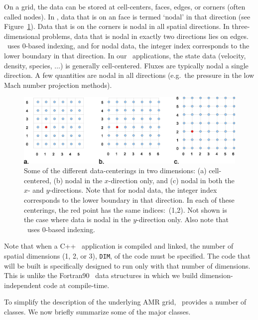 On a grid, the data can be stored at cell-centers, faces, edges, or
corners (often called nodes).  In \BoxLib, data that is on an face is termed `nodal'
in that direction (see Figure~\ref{fig:dataloc}).  Data that is on the
corners is nodal in all spatial directions.  In three-dimensional problems, data
that is nodal in exactly two directions lies on edges.
\BoxLib\ uses $0$-based indexing, and for nodal data, the integer index
corresponds to the lower boundary in that direction.
In our \BoxLib\ applications, the state data (velocity, density, 
species, $\ldots$) is generally cell-centered.  Fluxes are typically nodal a
single direction.  A few quantities are nodal in all directions 
(e.g.~the pressure in the low Mach number projection methods).
\begin{figure}[tb]
\centering
\includegraphics[width=6.5in]{./Introduction/data_loc2}
\caption{\label{fig:dataloc} Some of the different data-centerings in two dimensions:
(a) cell-centered, (b) nodal in the $x$-direction only, and (c) nodal in
both the $x$- and $y$-directions.  Note that for nodal data, the
integer index corresponds to the lower boundary in that direction.
In each of these centerings, the red point has the same indices:\ (1,2).
Not shown is the case where data is nodal in the $y$-direction only.  
Also note that \BoxLib\ uses $0$-based indexing.}
\end{figure}

Note that when a C++ \BoxLib\ application is compiled and linked,
the number of spatial dimensions (1, 2, or 3), {\tt DIM},
of the code must be specified.  The code that will be
built is specifically designed to run only with that number of dimensions.
This is unlike the Fortran90 \BoxLib\ data structures in which we build
dimension-independent code at compile-time.

To simplify the description of the underlying AMR grid, \BoxLib\
provides a number of classes.  We now briefly summarize some of the major
classes.

\subsection{\IntVect}

